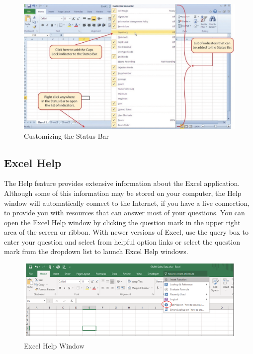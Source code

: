 \begin{figure}[H]
	\centering
	\includegraphics[width=\maxwidth{.95\linewidth}]{gfx/ch01_fig13}
	\caption{Customizing the Status Bar}
	\label{01:fig13}
\end{figure}

\subsection{Excel Help}

The Help feature provides extensive information about the Excel application. Although some of this information may be stored on your computer, the Help window will automatically connect to the Internet, if you have a live connection, to provide you with resources that can answer most of your questions. You can open the Excel Help window by clicking the question mark in the upper right area of the screen or ribbon. With newer versions of Excel, use the query box to enter your question and select from helpful option links or select the question mark from the dropdown list to launch Excel Help windows.

\begin{figure}[H]
	\centering
	\includegraphics[width=\maxwidth{.95\linewidth}]{gfx/ch01_fig14}
	\caption{Excel Help Window}
	\label{01:fig14}
\end{figure}

